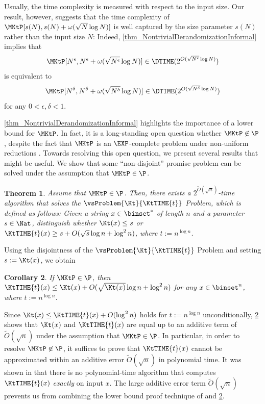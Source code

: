\documentclass[11pt]{article}
\numberwithin{equation}{section}
\newtheorem{theorem}{Theorem}[section]
\newtheorem{corollary}[theorem]{Corollary}
\theoremstyle{definition}
\theoremstyle{plain}
\begin{document}
Usually, the time complexity is measured with respect to the input size.
Our result, however, suggests that
the time complexity of $\MKtP[s(N), s(N) + {\omega}(\sqrt{N} \log N)]$ is well captured by the size parameter $s(N)$ rather than the input size $N$:
Indeed,
\cref{thm_NontrivialDerandomizationInformal} implies that
$$\MKtP[N^{\epsilon}, N^{\epsilon} + \omega( \sqrt{N^{\epsilon}} \log N )] \in \DTIME(2^{O( \sqrt{N^{\epsilon}} \log N )})$$
is equivalent to
$$\MKtP[N^{\delta}, N^{\delta} + \omega( \sqrt{N^{\delta}} \log N )] \in \DTIME(2^{O( \sqrt{N^{\delta}} \log N )})$$
for any $0 < \epsilon, \delta < 1$.


%
%
%
%

\cref{thm_NontrivialDerandomizationInformal} highlights the importance of a lower bound for $\MKtP$.
In fact,
it is a long-standing open question whether $\MKtP \not\in \P$, despite the fact that $\MKtP$ is an $\EXP$-complete problem under non-uniform reductions \cite{AllenderBKMR06_siamcomp_journals}.
Towards resolving this open question,
we present several results that might be useful.
We show that
some ``non-disjoint'' promise problem can be solved
under the assumption that $\MKtP \in \P$.
\begin{theorem}
  \label{thm_KtvsKt}
  Assume that $\MKtP \in \P$.
  Then, there exists a $2^{\widetilde{O}(\sqrt{n})}$-time algorithm that solves the $\vsProblem{\Kt}{\KtTIME{t}}$ Problem, which is defined as follows:
  Given a string $x \in \binset^*$ of length $n$ and a parameter $s \in \Nat$,
  distinguish whether
  $\Kt(x) \le s$
  or
  $\KtTIME{t}(x) \ge s + O(\sqrt{s} \log n + \log^2 n)$,
  where $t := n^{\log n}$.
\end{theorem}
Using the disjointness of the $\vsProblem{\Kt}{\KtTIME{t}}$ Problem and setting $s := \Kt(x)$, we obtain
\begin{corollary}
  \label{cor_KtvsKt}
  If $\MKtP \in \P$,
  then
  $\KtTIME{t}(x) \le \Kt(x) + O(\sqrt{\Kt(x)} \log n + \log^2 n)$
  for any $x \in \binset^n$,
  where  $t := n^{\log n}$.
\end{corollary}

Since $\Kt(x) \le \KtTIME{t}(x) + O(\log^2 n)$ holds for $t := n^{\log n}$ unconditionally,
\cref{cor_KtvsKt} shows that
$\Kt(x)$ and $\KtTIME{t}(x)$ are
equal up to an additive term of $\widetilde{O}(\sqrt{n})$
under the assumption that $\MKtP \in \P$.
In particular,
in order to resolve $\MKtP \not\in \P$,
it suffices to prove that
$\KtTIME{t}(x)$ cannot be approximated
within an additive error $\widetilde{O}(\sqrt{n})$
in polynomial time.
It was shown in \cite{Hirahara20_stoc_conf} that
there is no polynomial-time algorithm
that computes
$\KtTIME{t}(x)$ \emph{exactly} on input $x$.
The large additive error term $\widetilde{O}(\sqrt{n})$ prevents us from combining the lower bound proof technique of \cite{Hirahara20_stoc_conf} and \cref{cor_KtvsKt}.
\end{document}
